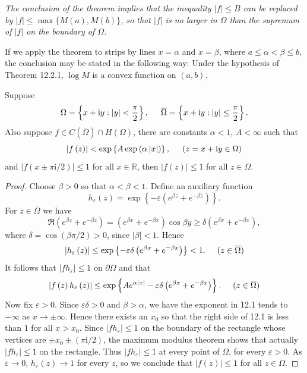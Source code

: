 \begin{note}\em
The conclusion of the theorem implies that the inequality $|f|\le B$ can be replaced by $|f|\le\max\{M(a),M(b)\}$, so that $|f|$ is no larger in $\Omega$ than the supremum of $|f|$ on the boundary of $\Omega$.\par
\end{note}
If we apply the theorem to strips by lines $x=\alpha$ and $x=\beta$, where $a\le\alpha<\beta\le b$, the conclusion may be stated in the following way: Under the hypothesis of Theorem 12.2.1, $\log M$ is a convex function on $(a,b)$.
\begin{theorem}
Suppose 
$$
\Omega =\left\{ x+\mathrm{i}y:\left| y \right|<\frac{\pi}{2} \right\} ,\hspace{0.5cm}\overline{\Omega }=\left\{ x+\mathrm{i}y:\left| y \right|\le \frac{\pi}{2} \right\} .
$$
Also suppose $f\in C(\overline{\Omega})\cap H(\Omega)$, there are constants $\alpha<1$, $A<\infty$ such that 
$$
\left| f\left( z \right) \right|<\exp \left\{ A\exp \left( \alpha \left| x \right| \right) \right\} ,\hspace{0.5cm}\left( z=x+\mathrm{i}y\in \Omega \right) 
$$
and $|f(x\pm\pi\mathrm{i}/2)|\le 1$ for all $x\in\mathbb{R}$, then $|f(z)|\le 1$ for all $z\in\Omega$.
\end{theorem}
\begin{proof}
Choose $\beta>0$ so that $\alpha<\beta<1$. Define an auxiliary function 
$$
h_{\varepsilon}\left( z \right) =\exp \left\{ -\varepsilon \left( e^{\beta z}+e^{-\beta z} \right) \right\} .
$$
For $z\in\overline{\Omega}$ we have 
$$
\Re \left( e^{\beta z}+e^{-\beta z} \right) =\left( e^{\beta x}+e^{-\beta x} \right) \cos \beta y\ge \delta \left( e^{\beta x}+e^{-\beta x} \right) ,
$$
where $\delta=\cos(\beta\pi/2)>0$, since $|\beta|<1$. Hence 
$$
\left| h_{\varepsilon}\left( z \right) \right|\le \exp \left\{ -\varepsilon \delta \left( e^{\beta x}+e^{-\beta x} \right) \right\} <1.\hspace{0.5cm}(z\in \overline{\Omega })
$$
It follows that $|fh_\varepsilon|\le 1$ on $\partial\Omega$ and that 
\begin{equation}
\left| f\left( z \right) h_{\varepsilon}\left( z \right) \right|\le \exp \left\{ Ae^{\alpha \left| x \right|}-\varepsilon \delta \left( e^{\beta x}+e^{-\beta x} \right) \right\} .\hspace{0.5cm}(z\in \overline{\Omega })
\end{equation}
Now fix $\varepsilon>0$. Since $\varepsilon\delta>0$ and $\beta>\alpha$, we have the exponent in 12.1 tends to $-\infty$ as $x\to\pm\infty$. Hence there exists an $x_0$ so that the right side of 12.1 is less than $1$ for all $x>x_0$. Since $|fh_\varepsilon|\le 1$ on the boundary of the rectangle whose vertices are $\pm x_0\pm(\pi\mathrm{i}/2)$, the maximum modulus theorem shows that actually $|fh_\varepsilon|\le 1$ on the rectangle. Thus $|fh_\varepsilon|\le 1$ at every point of $\Omega$, for every $\varepsilon>0$. As $\varepsilon\to 0$, $h_\varepsilon(z)\to 1$ for every $z$, so we conclude that $|f(z)|\le 1$ for all $z\in\Omega$.
\end{proof}
